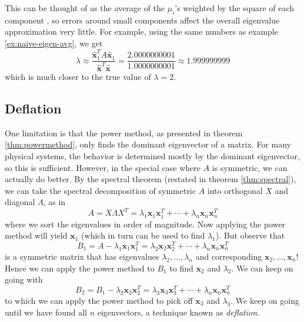 \documentclass{article}
\let\vec\mathbf
\begin{document}
This can be thought of as the average of the $\mu_i$'s weighted by the square of each component \cite{mit-sensitivity}, so errors around small components affect the overall eigenvalue approximation very little. For example, using the same numbers as example \ref{ex:naive-eigen-avg}, we get
\begin{equation*}
  \lambda \approx \frac{\hat{\vec{x}}_1^T A \hat{\vec{x}}_1}{\hat{\vec{x}}^T\hat{\vec{x}}} = \frac{2.0000000001}{1.0000000001} \approx 1.999999999
\end{equation*}
which is much closer to the true value of $\lambda = 2$.

\subsection{Deflation}
One limitation is that the power method, as presented in theorem \ref{thm:powermethod}, only finds the dominant eigenvector of a matrix. For many physical systems, the behavior is determined mostly by the dominant eigenvector, so this is sufficient. However, in the special case where $A$ is symmetric, we can actually do better. By the spectral theorem (restated in theorem \ref{thm:spectral}), we can take the spectral decomposition of symmetric $A$ into orthogonal $X$ and diagonal $\Lambda$, as in
\begin{equation*}
  A = X \Lambda X^T = \lambda_1 \vec{x}_1 \vec{x}_1^T + \cdots + \lambda_n \vec{x}_n \vec{x}_n^T
\end{equation*}
where we sort the eigenvalues in order of magnitude. Now applying the power method will yield $\vec{x}_1$ (which in turn can be used to find $\lambda_1$). But observe that
\begin{equation*}
  B_1 = A - \lambda_1 \vec{x}_1 \vec{x}_1^T = \lambda_2 \vec{x}_2 \vec{x}_2^T + \cdots + \lambda_n \vec{x}_n \vec{x}_n^T
\end{equation*}
is a symmetric matrix that has eigenvalues $\lambda_2, \ldots, \lambda_n$ and corresponding $\vec{x}_2, \ldots, \vec{x}_n$! Hence we can apply the power method to $B_1$ to find $\vec{x}_2$ and $\lambda_2$. We can keep on going with
\begin{equation*}
  B_2 = B_1 - \lambda_2 \vec{x}_2 \vec{x}_2^T = \lambda_3 \vec{x}_3 \vec{x}_3^T + \cdots + \lambda_n \vec{x}_n \vec{x}_n^T
\end{equation*}
to which we can apply the power method to pick off $\vec{x}_3$ and $\lambda_3$. We keep on going until we have found all $n$ eigenvectors, a technique known as \textit{deflation}.
\end{document}
